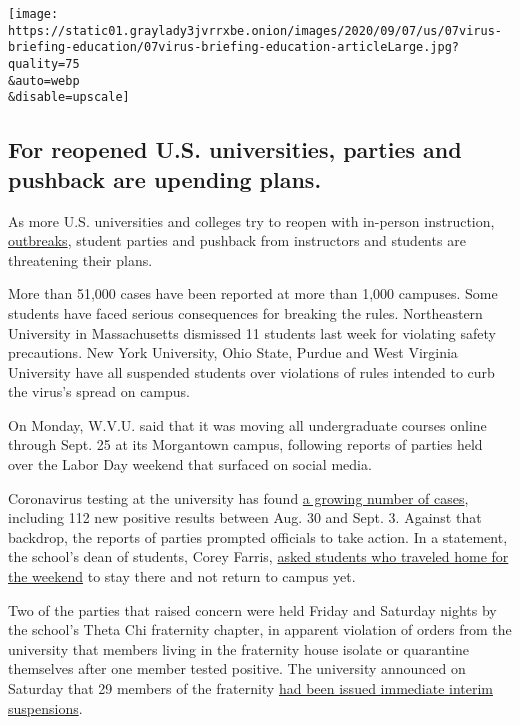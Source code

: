 \texttt{[image: https://static01.graylady3jvrrxbe.onion/images/2020/09/07/us/07virus-briefing-education/07virus-briefing-education-articleLarge.jpg?quality=75\\\&auto=webp\\\&disable=upscale]}

\hypertarget{for-reopened-us-universities-parties-and-pushback-are-upending-plans}{%
\subsection{For reopened U.S. universities, parties and pushback are
upending
plans.}\label{for-reopened-us-universities-parties-and-pushback-are-upending-plans}}

As more U.S. universities and colleges try to reopen with in-person
instruction,
\href{https://www.nytimes3xbfgragh.onion/2020/09/06/us/colleges-coronavirus-students.html}{outbreaks},
student parties and pushback from instructors and students are
threatening their plans.

More than 51,000 cases have been reported at more than 1,000 campuses.
Some students have faced serious consequences for breaking the rules.
Northeastern University in Massachusetts dismissed 11 students last week
for violating safety precautions. New York University, Ohio State,
Purdue and West Virginia University have all suspended students over
violations of rules intended to curb the virus's spread on campus.

On Monday, W.V.U. said that it was moving all undergraduate courses
online through Sept. 25 at its Morgantown campus, following reports of
parties held over the Labor Day weekend that surfaced on social media.

Coronavirus testing at the university has found
\href{https://www.wvu.edu/return-to-campus/daily-test-results/morgantown\#daily-campus-testing}{a
growing number of cases}, including 112 new positive results between
Aug. 30 and Sept. 3. Against that backdrop, the reports of parties
prompted officials to take action. In a statement, the school's dean of
students, Corey Farris,
\href{https://wvutoday.wvu.edu/stories/2020/09/07/wvu-moves-undergraduate-classes-online-through-sept-25-on-morgantown-campus-reduces-in-person-activities}{asked
students who traveled home for the weekend} to stay there and not return
to campus yet.

Two of the parties that raised concern were held Friday and Saturday
nights by the school's Theta Chi fraternity chapter, in apparent
violation of orders from the university that members living in the
fraternity house isolate or quarantine themselves after one member
tested positive. The university announced on Saturday that 29 members of
the fraternity
\href{https://wvutoday.wvu.edu/stories/2020/09/06/wvu-suspends-29-students-for-covid-19-related-violations-additional-sanctions-pending}{had
been issued immediate interim suspensions}.

